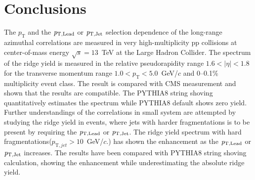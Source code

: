 
\section{Conclusions}
\label{sec:summary}


The $p_{\mathrm T}$ and the $\it{p}_{\rm{T,Lead}}$ or $\it{p}_{\rm{T,Jet}}$ selection dependence of the long-range azimuthal correlations are measured in very high-multiplicity pp collisions at center-of-mass energy $\sqrt{s} = 13$~TeV at the Large Hadron Collider. The spectrum of the ridge yield is measured in the relative pseudorapidity range $1.6 < |\eta| < 1.8$ for the transverse momentum range $1.0 < p_{\mathrm T} < 5.0$~GeV/$c$ and 0--0.1\% multiplicity event class. The result is compared with CMS measurement and shown that the results are compatible. The PYTHIA8 string shoving quantitatively estimates the spectrum while PYTHIA8 default shows zero yield. Further understandings of the correlations in small system are attempted by studying the ridge yield in events, where jets with harder fragmentations is to be present by requiring the $\it{p}_{\rm{T,Lead}}$ or $\it{p}_{\rm{T,Jet}}$. The ridge yield spectrum with hard fragmentations($p_{\mathrm T, jet} > 10$~GeV/$c$.) has shown the enhancement as the $\it{p}_{\rm{T,Lead}}$ or $\it{p}_{\rm{T,Jet}}$ increases. The results have been compared with PYTHIA8 string shoving calculation, showing the enhancement while underestimating the absolute ridge yield. 